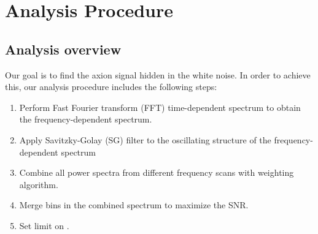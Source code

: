 \section{Analysis Procedure} \label{sec:ana}
    \subsection{Analysis overview}
Our goal is to find the axion signal hidden in the white noise. In order to achieve this, our analysis procedure includes the following steps:
    \begin{enumerate}
        \item Perform Fast Fourier transform (FFT) time-dependent spectrum to obtain the frequency-dependent spectrum.
        \item Apply Savitzky-Golay (SG) filter to the oscillating structure of the frequency-dependent spectrum
        \item Combine all power spectra from different frequency scans with weighting algorithm.
        \item Merge bins in the combined spectrum to maximize the SNR.
        \item Set limit on \gagg.
    \end{enumerate}

